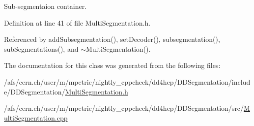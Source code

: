 Sub-\/segmentaion container. 

Definition at line 41 of file MultiSegmentation.h.

Referenced by addSubsegmentation(), setDecoder(), subsegmentation(), subSegmentations(), and $\sim$MultiSegmentation().

The documentation for this class was generated from the following files:\begin{DoxyCompactItemize}
\item 
/afs/cern.ch/user/m/mpetric/nightly\_\-cppcheck/dd4hep/DDSegmentation/include/DDSegmentation/\hyperlink{_d_d_segmentation_2include_2_d_d_segmentation_2_multi_segmentation_8h}{MultiSegmentation.h}\item 
/afs/cern.ch/user/m/mpetric/nightly\_\-cppcheck/dd4hep/DDSegmentation/src/\hyperlink{_d_d_segmentation_2src_2_multi_segmentation_8cpp}{MultiSegmentation.cpp}\end{DoxyCompactItemize}
